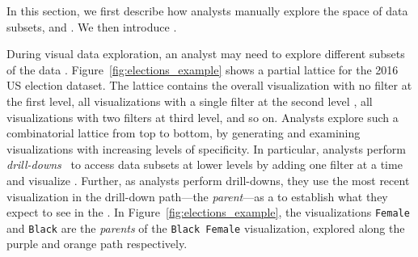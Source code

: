In this section, we first describe how analysts 
manually explore the space of data subsets, 
and . 
We then introduce .

During visual data exploration, 
an analyst may need to explore different subsets 
of the data . 
Figure~\ref{fig:elections_example}
shows a partial lattice for the 2016 US election dataset. 
The lattice contains the overall visualization 
with no filter at the first level, 
all visualizations with a single filter 
at the second level , 
all visualizations with two filters at third level, 
and so on. 
Analysts explore such a combinatorial lattice 
from top to bottom, by generating and examining 
visualizations with increasing levels of specificity. 
In particular, analysts perform \emph{drill-downs}~\cite{OLAP} 
to access data subsets at lower levels by 
adding one filter at a time 
and visualize 
. 
Further, as analysts perform drill-downs, 
they use the most recent visualization 
in the drill-down path---the {\em parent}---as a 
to establish what they expect to see in the 
. 
In Figure~\ref{fig:elections_example}, 
the visualizations \texttt{Female} and \texttt{Black} 
are the \emph{parents} of the \texttt{Black Female} visualization, 
explored along the purple and orange path respectively.

